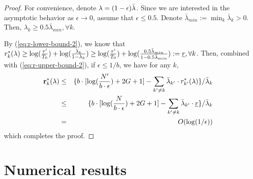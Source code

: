 \documentclass{IEEEtran}
\begin{document}
\begin{proof}
For convenience, denote ${\bf \lambda}=(1-\epsilon)\bar{{\bf \lambda}}$.
Since we are interested in the asymptotic behavior as $\epsilon\rightarrow0$,
assume that $\epsilon\le0.5$. Denote $\bar{\lambda}_{min}:=\min_{k}\bar{\lambda}_{k}>0$.
Then, $\lambda_{k}\ge0.5\bar{\lambda}_{min},\forall k$. 

By (\ref{eq:r-lower-bound-2}), we know that $r_{k}^{*}({\bf \lambda})\ge\log(\frac{\tau'}{T_{0}})+\log(\frac{\lambda_{k}}{1-\lambda_{k}})\ge\log(\frac{\tau'}{T_{0}})+\log(\frac{0.5\bar{\lambda}_{min}}{1-0.5\bar{\lambda}_{min}}):=\underline{r},\forall k$.
Then, combined with (\ref{eq:r-upper-bound-2}), if $\epsilon\le1/b$,
we have for any $k$,\begin{eqnarray*}
{\bf r}_{k}^{*}({\bf \lambda}) & \le & \{b\cdot[\log(\frac{N'}{b\cdot\epsilon})+2G+1]-\sum_{k'\ne k}\bar{\lambda}_{k'}\cdot r_{k'}^{*}({\bf \lambda})\}/\bar{\lambda}_{k}\\
 & \le & \{b\cdot[\log(\frac{N}{b\cdot\epsilon})+2G+1]-\sum_{k'\ne k}\bar{\lambda}_{k'}\cdot\underline{r}\}/\bar{\lambda}_{k}\\
 & = & O(\log(1/\epsilon))\end{eqnarray*}
which completes the proof.\begin{comment}
\emph{Remark}: The value of $b$ can be computed by (\ref{eq:b}).
But it may be computationally expensive if $N'$ is large. Obtaining
a simpler expression for $b$ is interesting for future work. However,
the above result suffices to show that $\max_{k}r_{k}^{*}((1-\epsilon)\bar{{\bf \lambda}})$
is smaller than $O(\log(1/\epsilon))$.
\end{comment}
{}
\end{proof}

\section{\label{sec:Simulation-algorithm}Numerical results}
\end{document}
